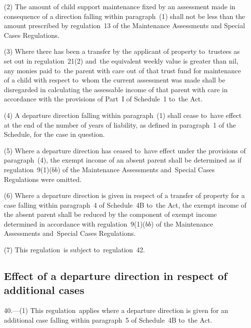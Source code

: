 \documentclass[12pt,a4paper]{article}
\begin{document}
(2) The amount of child support maintenance fixed by an assessment made in
consequence of a direction falling within paragraph~(1) shall not be less than
the amount prescribed by regulation~13 of the Maintenance Assessments and
Special Cases Regulations.

(3) Where there has been a transfer by the applicant of property to~trustees as
set out in regulation~21(2) and~the equivalent weekly value is greater than nil,
any monies paid to~the parent with care out of that trust fund for maintenance
of a child with respect to~whom the current assessment was made shall be
disregarded in calculating the assessable income of that parent with care in
accordance with the provisions of Part~I of Schedule~1 to~the Act.

(4) A departure direction falling within paragraph~(1) shall cease to~have
effect at the end of the number of years of liability, as defined in paragraph~1
of the Schedule, for the case in question.

(5) Where a departure direction has ceased to~have effect under the provisions
of paragraph~(4), the exempt income of an absent parent shall be determined as
if regulation~9(1)($bb$) of the Maintenance Assessments and~Special Cases
Regulations were omitted.

(6) Where a departure direction is given in respect of a transfer of property
for a case falling within paragraph~4 of Schedule~4B to~the Act, the exempt
income of the absent parent shall be reduced by the component of exempt income
determined in accordance with regulation~9(1)($bb$) of the Maintenance Assessments
and~Special Cases Regulations.

(7) This regulation~is subject to~regulation~42.


\subsection[40. Effect of a departure direction in respect of additional cases]{Effect of a departure direction in respect of additional cases}

40.—(1) This
regulation~applies where a departure direction is given for an additional case
falling within paragraph~5 of Schedule~4B to~the Act.
\end{document}
